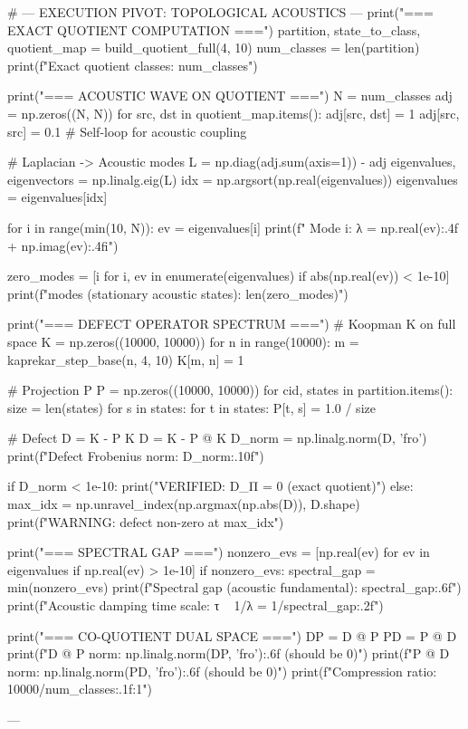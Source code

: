 # --- EXECUTION PIVOT: TOPOLOGICAL ACOUSTICS ---
print("=== EXACT QUOTIENT COMPUTATION ===")
partition, state_to_class, quotient_map = build_quotient_full(4, 10)
num_classes = len(partition)
print(f"Exact quotient classes: {num_classes}")

print("\n=== ACOUSTIC WAVE ON QUOTIENT ===")
N = num_classes
adj = np.zeros((N, N))
for src, dst in quotient_map.items():
    adj[src, dst] = 1
    adj[src, src] = 0.1  # Self-loop for acoustic coupling

# Laplacian -> Acoustic modes
L = np.diag(adj.sum(axis=1)) - adj
eigenvalues, eigenvectors = np.linalg.eig(L)
idx = np.argsort(np.real(eigenvalues))
eigenvalues = eigenvalues[idx]

for i in range(min(10, N)):
    ev = eigenvalues[i]
    print(f"  Mode {i}: λ = {np.real(ev):.4f} + {np.imag(ev):.4f}i")

zero_modes = [i for i, ev in enumerate(eigenvalues) if abs(np.real(ev)) < 1e-10]
print(f"\nZero modes (stationary acoustic states): {len(zero_modes)}")

print("\n=== DEFECT OPERATOR SPECTRUM ===")
# Koopman K on full space
K = np.zeros((10000, 10000))
for n in range(10000):
    m = kaprekar_step_base(n, 4, 10)
    K[m, n] = 1

# Projection P
P = np.zeros((10000, 10000))
for cid, states in partition.items():
    size = len(states)
    for s in states:
        for t in states:
            P[t, s] = 1.0 / size

# Defect D = K - P K
D = K - P @ K
D_norm = np.linalg.norm(D, 'fro')
print(f"Defect Frobenius norm: {D_norm:.10f}")

if D_norm < 1e-10:
    print("VERIFIED: D_Π = 0 (exact quotient)")
else:
    max_idx = np.unravel_index(np.argmax(np.abs(D)), D.shape)
    print(f"WARNING: defect non-zero at {max_idx}")

print("\n=== SPECTRAL GAP ===")
nonzero_evs = [np.real(ev) for ev in eigenvalues if np.real(ev) > 1e-10]
if nonzero_evs:
    spectral_gap = min(nonzero_evs)
    print(f"Spectral gap (acoustic fundamental): {spectral_gap:.6f}")
    print(f"Acoustic damping time scale: τ ~ 1/λ = {1/spectral_gap:.2f}")

print("\n=== CO-QUOTIENT DUAL SPACE ===")
DP = D @ P
PD = P @ D
print(f"D @ P norm: {np.linalg.norm(DP, 'fro'):.6f} (should be 0)")
print(f"P @ D norm: {np.linalg.norm(PD, 'fro'):.6f} (should be 0)")
print(f"Compression ratio: {10000/num_classes:.1f}:1")

---

